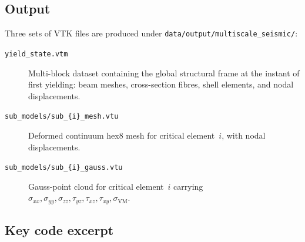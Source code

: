 \subsection{Output}

Three sets of VTK files are produced
under \texttt{data/output/multiscale\_seismic/}:

\begin{description}
  \item[\texttt{yield\_state.vtm}]
    Multi-block dataset containing the global structural frame at the
    instant of first yielding: beam meshes, cross-section fibres, shell
    elements, and nodal displacements.
  \item[\texttt{sub\_models/sub\_\{i\}\_mesh.vtu}]
    Deformed continuum hex8 mesh for critical element~$i$, with nodal
    displacements.
  \item[\texttt{sub\_models/sub\_\{i\}\_gauss.vtu}]
    Gauss-point cloud for critical element~$i$ carrying
    $\sigma_{xx}, \sigma_{yy}, \sigma_{zz}, \tau_{yz}, \tau_{xz},
    \tau_{xy}, \sigma_\text{VM}$.
\end{description}

\subsection{Key code excerpt}

